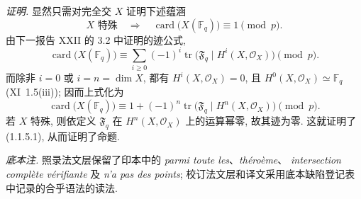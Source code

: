 \medskip
\noindent\emph{证明.}
显然只需对完全交 $X$ 证明下述蕴涵
\begin{equation}\tag{1.1.5.1}
X\text{ 特殊}\quad\Longrightarrow\quad
\operatorname{card}\bigl(X(\mathbb F_q)\bigr)\equiv1\pmod p.
\end{equation}
由下一报告 XXII 的 3.2 中证明的迹公式,
\begin{equation*}
\operatorname{card}\bigl(X(\mathbb F_q)\bigr)
\equiv\sum_{i\geq0}(-1)^i
\operatorname{tr}\bigl(\mathfrak F_q\mid H^i(X,\mathcal O_X)\bigr)
\pmod p.
\end{equation*}
而除非 $i=0$ 或 $i=n=\dim X$, 都有 $H^i(X,\mathcal O_X)=0$,
且 $H^0(X,\mathcal O_X)\simeq\mathbb F_q$ (XI~1.5(iii)); 因而上式化为
\begin{equation*}
\operatorname{card}\bigl(X(\mathbb F_q)\bigr)
\equiv1+(-1)^n
\operatorname{tr}\bigl(\mathfrak F_q\mid H^n(X,\mathcal O_X)\bigr)
\pmod p.
\end{equation*}
若 $X$ 特殊, 则依定义 $\mathfrak F_q$ 在 $H^n(X,\mathcal O_X)$ 上的运算幂零,
故其迹为零. 这就证明了 (1.1.5.1), 从而证明了命题.

\medskip
\noindent\emph{底本注.}
照录法文层保留了印本中的 \emph{parmi toute les}、\emph{théroème}、
\emph{intersection complète vérifiante} 及 \emph{n'a pas des points};
校订法文层和译文采用底本缺陷登记表中记录的合乎语法的读法.
